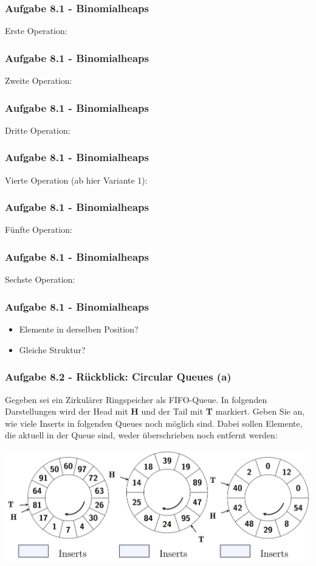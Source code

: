 \documentclass{beamer}
\begin{document}
\begin{frame}[t]
	\frametitle{Aufgabe 8.1 -  Binomialheaps}
	Erste Operation:
\end{frame}

\begin{frame}[t]
	\frametitle{Aufgabe 8.1 -  Binomialheaps}
	Zweite Operation:
\end{frame}

\begin{frame}[t]
	\frametitle{Aufgabe 8.1 -  Binomialheaps}
	Dritte Operation:
\end{frame}

\begin{frame}[t]
	\frametitle{Aufgabe 8.1 -  Binomialheaps}
	Vierte Operation (ab hier Variante 1):
\end{frame}

\begin{frame}[t]
	\frametitle{Aufgabe 8.1 -  Binomialheaps}
	Fünfte Operation:
\end{frame}

\begin{frame}[t]
	\frametitle{Aufgabe 8.1 -  Binomialheaps}
	Sechste Operation:
\end{frame}

\begin{frame}[t]
	\frametitle{Aufgabe 8.1 -  Binomialheaps}
	\begin{itemize}
		\item Elemente in derselben Position?
		\item Gleiche Struktur?
	\end{itemize}
\end{frame}

\begin{frame}[t]
	\frametitle{Aufgabe 8.2 - Rückblick: Circular Queues (a)}
	{\small
		Gegeben sei ein Zirkulärer Ringspeicher als FIFO-Queue. In folgenden Darstellungen
		wird der Head mit \textbf{H} und der Tail mit \textbf{T} markiert. Geben Sie an, wie viele Inserts in
		folgenden Queues noch möglich sind. Dabei sollen Elemente, die aktuell in der Queue
		sind, weder überschrieben noch entfernt werden:
	}

	\medskip

	\includegraphics[width=\textwidth]{images/circular_queue_a.png}
\end{frame}
\end{document}
